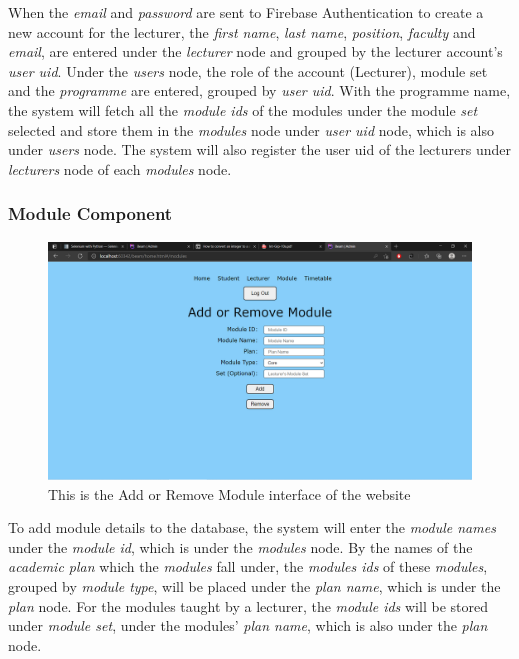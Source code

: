 \documentclass[../report.tex]{subfiles}
\begin{document}


When the \textit{email} and \textit{password} are sent to Firebase Authentication to create a new account for the lecturer, the \textit{first name}, \textit{last name}, \textit{position}, \textit{faculty} and \textit{email}, are entered under the \textit{lecturer} node and grouped by the lecturer account’s \textit{user uid}. Under the \textit{users} node, the role of the account (Lecturer), module set and the \textit{programme} are entered, grouped by \textit{user uid}. With the programme name, the system will fetch all the \textit{module ids} of the modules under the module \textit{set} selected and store them in the \textit{modules} node under \textit{user uid} node, which is also under \textit{users} node. The system will also register the user uid of the lecturers under \textit{lecturers} node of each \textit{modules} node.

\bigskip
\subsubsection{Module Component}
\begin{figure}[H]
	\centering
	\includegraphics[width=.7\linewidth]{../images/07/01-05-module.png}
	\caption{This is the Add or Remove Module interface of the website}
	\label{fig:07-01-05-module}
\end{figure}



To add module details to the database, the system will enter the \textit{module names} under the \textit{module id}, which is under the \textit{modules} node. By the names of the \textit{academic plan} which the \textit{modules} fall under, the \textit{modules ids} of these \textit{modules}, grouped by \textit{module type}, will be placed under the \textit{plan name}, which is under the \textit{plan} node. For the modules taught by a lecturer, the \textit{module ids} will be stored under \textit{module set}, under the modules' \textit{plan name}, which is also under the \textit{plan} node.
\end{document}
